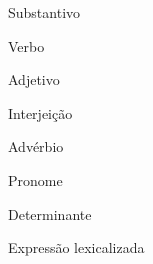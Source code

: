 \begin{description}[leftmargin=3cm, style=multiline]
  \item[S.] Substantivo
  \item[V.] Verbo
  \item[ADJ.] Adjetivo
  \item[INTJ.] Interjeição
  \item[ADV.] Advérbio
  \item[PRON.] Pronome
  \item[DET.] Determinante
  \item[LEX.] Expressão lexicalizada
\end{description}